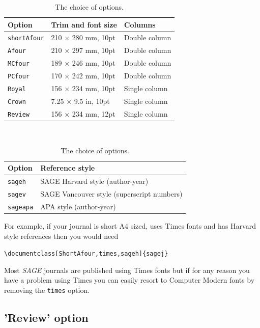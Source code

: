 \documentclass[Afour,sageh,times]{includes/tex/sagej}
\begin{document}
\begin{table}[h]
  \small\sf\centering
  \caption{The choice of options.\label{T1}}
  \begin{tabular}{lll}
  \toprule
  Option              & Trim and font size         & Columns       \\
  \midrule
  \texttt{shortAfour} & 210 $\times$ 280 mm, 10pt  & Double column \\
  \texttt{Afour}      & 210 $\times$ 297 mm, 10pt  & Double column \\
  \texttt{MCfour}     & 189 $\times$ 246 mm, 10pt  & Double column \\
  \texttt{PCfour}     & 170 $\times$ 242 mm, 10pt  & Double column \\
  \texttt{Royal}      & 156 $\times$ 234 mm, 10pt  & Single column \\
  \texttt{Crown}      & 7.25 $\times$ 9.5 in, 10pt & Single column \\
  \texttt{Review}     & 156 $\times$ 234 mm, 12pt  & Single column \\
  \bottomrule
  \end{tabular}\\[10pt]
  \begin{tabular}{ll}
  \toprule
  Option&Reference style\\
  \midrule
  \texttt{sageh}&SAGE Harvard style (author-year)\\
  \texttt{sagev}&SAGE Vancouver style (superscript numbers)\\
  \texttt{sageapa}&APA style (author-year)\\
  \bottomrule
  \end{tabular}
\end{table}

For example, if your journal is short A4 sized, uses Times fonts and has
Harvard style references then you would need

\begin{small}
\noindent \verb+\documentclass[ShortAfour,times,sageh]{sagej}+
\end{small}

Most \textit{SAGE} journals are published using Times fonts but if for
any reason you have a problem using Times you can easily resort to
Computer Modern fonts by removing the \verb"times" option.

\subsection{'Review' option}
\end{document}

